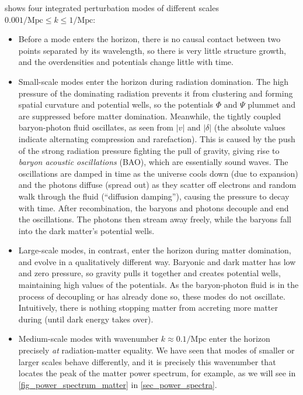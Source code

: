 \documentclass[10pt,a4paper]{article}
\begin{document}
 shows four integrated perturbation modes of different scales $0.001/\mathrm{Mpc} \leq k \leq 1/\mathrm{Mpc}$:
\begin{itemize}
\item
Before a mode enters the horizon,
there is no causal contact between two points separated by its wavelength,
so there is very little structure growth, and the overdensities and potentials change little with time.

\item
Small-scale modes enter the horizon during radiation domination.
The high pressure of the dominating radiation prevents it from clustering and forming spatial curvature and potential wells,
so the potentials $\Phi$ and $\Psi$ plummet and are suppressed before matter domination.
Meanwhile, the tightly coupled baryon-photon fluid oscillates, as seen from $|v|$ and $|\delta|$ (the absolute values indicate alternating compression and rarefaction).
This is caused by the push of the strong radiation pressure fighting the pull of gravity, giving rise to \emph{baryon acoustic oscillations} (BAO), which are essentially sound waves.
The oscillations are damped in time as the universe cools down (due to expansion) and the photons diffuse (spread out) as they scatter off electrons and random walk through the fluid (``diffusion damping''), causing the pressure to decay with time.
After recombination, the baryons and photons decouple and end the oscillations.
The photons then stream away freely, while the baryons fall into the dark matter's potential wells.

\item
Large-scale modes, in contrast, enter the horizon during matter domination, and evolve in a qualitatively different way.
Baryonic and dark matter has low and zero pressure,
so gravity pulls it together and creates potential wells, maintaining high values of the potentials.
As the baryon-photon fluid is in the process of decoupling or has already done so, these modes do not oscillate.
Intuitively, there is nothing stopping matter from accreting more matter during (until dark energy takes over).

\item
Medium-scale modes with wavenumber $k \approx 0.1 / \textrm{Mpc}$ enter the horizon precisely \emph{at} radiation-matter equality.
We have seen that modes of smaller or larger scales behave differently,
and it is precisely this wavenumber that locates the peak of the matter power spectrum, for example,
as we will see in \cref{fig_power_spectrum_matter} in \cref{sec_power_spectra}.


\end{itemize}
\end{document}
